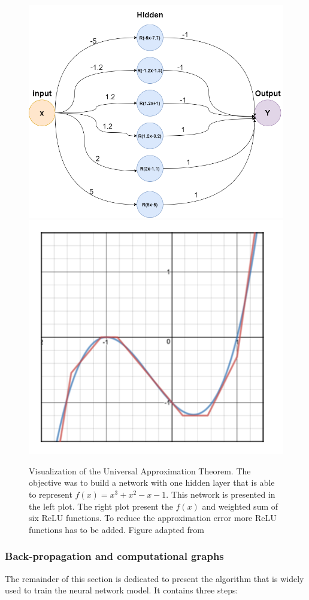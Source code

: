 \begin{figure}[!htb]
 \begin{center}
   \includegraphics[width=0.7\linewidth]{figures/UAT_2.png}\\
    \includegraphics[width=0.7\linewidth]{figures/UAT.PNG}
   \caption[Visualization of the Universal Approximation Theorem]{Visualization of the Universal Approximation Theorem. The objective was to build a network with one hidden layer that is able to represent $f(x)= x^{3}+x^{2}-x-1$. This network is presented in the left plot. The right plot present the $f(x)$ and weighted sum of six ReLU functions. To reduce the approximation error more ReLU functions has to be added. Figure adapted from~\cite{UAT_blog}
     \label{fig:Universal_approx}}
 \end{center}
\end{figure}

\subsubsection{Back-propagation and computational graphs}
The remainder of this section is dedicated to present the algorithm that is widely used to train the neural network model. It contains three steps: 

